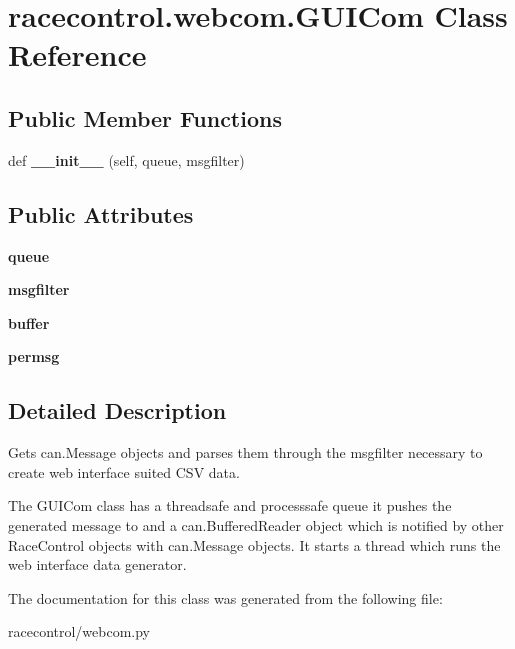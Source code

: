 \section{racecontrol.\+webcom.\+G\+U\+I\+Com Class Reference}
\label{classracecontrol_1_1webcom_1_1GUICom}
\subsection*{Public Member Functions}
\begin{DoxyCompactItemize}
\item 
def {\bfseries \+\_\+\+\_\+init\+\_\+\+\_\+} (self, queue, msgfilter)\label{classracecontrol_1_1webcom_1_1GUICom_a06515a6004ff7f8554ea65483de9e684}

\end{DoxyCompactItemize}
\subsection*{Public Attributes}
\begin{DoxyCompactItemize}
\item 
{\bfseries queue}\label{classracecontrol_1_1webcom_1_1GUICom_aaee4be625caecf5e88a86c69b9672e8a}

\item 
{\bfseries msgfilter}\label{classracecontrol_1_1webcom_1_1GUICom_a9a7fb7d0154519fb4b4f9c50f206cb9c}

\item 
{\bfseries buffer}\label{classracecontrol_1_1webcom_1_1GUICom_a5cef744c84d93e37ef0d6726df5b7595}

\item 
{\bfseries permsg}\label{classracecontrol_1_1webcom_1_1GUICom_a1e1dadd40a811d3f91290cf827f92ec9}

\end{DoxyCompactItemize}


\subsection{Detailed Description}
\begin{DoxyVerb}Gets can.Message objects and parses them through the msgfilter necessary
to create web interface suited CSV data.

The GUICom class has a threadsafe and processsafe queue it pushes the
generated message to and a can.BufferedReader object which is notified by
other RaceControl objects with can.Message objects. It starts a thread
which runs the web interface data generator.
\end{DoxyVerb}
 

The documentation for this class was generated from the following file\+:\begin{DoxyCompactItemize}
\item 
racecontrol/webcom.\+py\end{DoxyCompactItemize}
